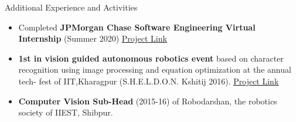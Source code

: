 \documentclass[]{mcdowellcv}
\begin{document}
	\begin{cvsection}{Additional Experience and Activities}
		\begin{cvsubsection}{}{}{}	
			\begin{itemize}
	
			    \item Completed \textbf{JPMorgan Chase Software Engineering Virtual Internship} (Summer 2020)  \underline{\href{https://github.com/Trisha11r/JP_Morgan_Chase_Virtual_Internship}{Project Link}}
				\item \textbf{1st in vision guided autonomous robotics event} based on character recognition using image processing and equation optimization at the annual tech- fest of IIT,Kharagpur (S.H.E.L.D.O.N. Kshitij 2016).  \underline{\href{https://github.com/Trisha11r/sheldon}{Project Link}}


				\item \textbf{Computer Vision Sub-Head} (2015-16) of Robodarshan, the robotics society of IIEST, Shibpur.
				
			\end{itemize}
		\end{cvsubsection}
	\end{cvsection}
	
	
	
\end{document}
